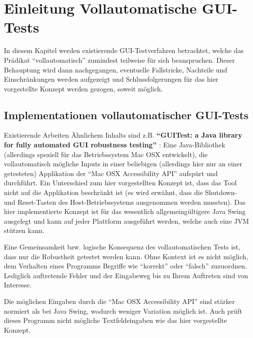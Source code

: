\chapter{Einleitung Vollautomatische GUI-Tests}\label{chapter:introfullautoguitesting}


In diesem Kapitel werden existierende GUI-Testverfahren betrachtet, welche das Prädikat
``vollautomatisch'' zumindest teilweise für sich beanspruchen. Dieser Behauptung wird
dann nachgegangen, eventuelle Fallstricke, Nachteile und Einschränkungen werden aufgezeigt
und Schlussfolgerungen für das hier vorgestellte Konzept werden gezogen, soweit möglich.


\section{Implementationen vollautomatischer GUI-Tests}\label{section:fullautoguitestsimpl}


Existierende Arbeiten Ähnlichem Inhalts sind z.B. \textbf{``GUITest: a Java library for fully automated
GUI robustness testing'' \cite{GUITestBauersfeld}}: Eine Java-Bibliothek 
(allerdings speziell für das Betriebssystem Mac OSX entwickelt), die
vollautomatisch mögliche Inputs in einer beliebigen (allerdings hier nur an einer getesteten)
Applikation der ``Mac OSX Accessibility API'' aufspürt und durchführt. Ein Unterschied zum
hier vorgestellten Konzept ist, dass das Tool nicht auf die Applikation beschränkt ist (es wird
erwähnt, dass die Shutdown- und Reset-Tasten des Host-Betriebssystems ausgenommen werden
mussten). Das hier implementierte Konzept ist für das wesentlich allgemeingültigere Java Swing
ausgelegt und kann auf jeder Plattform ausgeführt werden, welche auch eine JVM stützen kann.

Eine Gemeinsamkeit bzw. logische Konsequenz des vollautomatischen Tests ist, dass nur
die Robustheit getestet werden kann. Ohne Kontext ist es nicht möglich, dem Verhalten eines
Programms Begriffe wie ``korrekt'' oder ``falsch'' zuzuordnen. Lediglich auftretende
Fehler und der Eingabeweg bis zu Ihrem Auftreten sind von Interesse.

Die möglichen Eingaben durch die ``Mac OSX Accessibility API'' sind stärker normiert als bei
Java Swing, wodurch weniger Variation möglich ist. Auch prüft dieses Programm nicht mögliche
Textfeldeingaben wie das hier vorgestellte Konzept.

\vspace{1cm}

